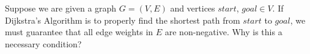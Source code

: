 Suppose we are given a graph $G=(V,E)$ and vertices $start$, $goal \in
V$.  If Dijkstra's Algorithm is to properly find the shortest path from
$start$ to $goal$, we must guarantee that all edge weights in $E$ are
non-negative.  Why is this a necessary condition?
